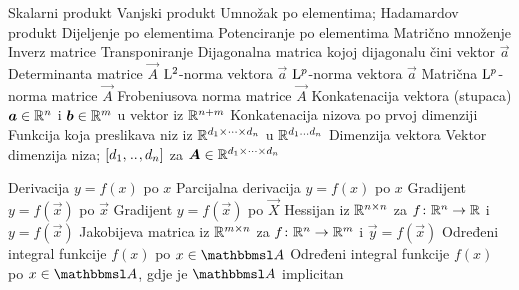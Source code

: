  {} 
	{Skalarni produkt}
	{Vanjski produkt}
	{Umnožak po elementima; Hadamardov produkt}
	{Dijeljenje po elementima}
	{Potenciranje po elementima}
	{Matrično množenje}
	{Inverz matrice}
	{Transponiranje}
	{Dijagonalna matrica kojoj dijagonalu čini vektor $\vec a$}
	{Determinanta matrice $\vec A$}
	{$\mathrm{L}^2$-norma vektora $\vec a$}
	{$\mathrm{L}^p$-norma vektora $\vec a$}
	{Matrična $\mathrm{L}^p$-norma matrice $\vec A$}
	{Frobeniusova norma matrice $\vec A$}
	{Konkatenacija vektora (stupaca) $\vec a\in\R^n$ i $\vec b\in\R^m$ u vektor iz $\mathbb{R}^{n+m}$}
	{Konkatenacija nizova po prvoj dimenziji}
	{Funkcija koja preslikava niz iz $\mathbb{R}^{d_1\times\dots\times d_n}$ u $\mathbb{R}^{d_1\dots d_n}$}
	{Dimenzija vektora}
	{Vektor dimenzija niza; $\sbr{d_1,\bidot,d_n}$ za $\vec A\in\R^{d_1\times\dots\times d_n}$}

	{Derivacija $y=f(x)$ po $x$}
	{Parcijalna derivacija $y=f(x)$ po $x$}
	{Gradijent $y=f(\vec x)$ po $\vec x$}
	{Gradijent $y=f(\vec x)$ po $\vec X$}
	{Hessijan iz $\mathbb{R}^{n\times n}$ za $f \colon \mathbb{R}^n \to \mathbb{R}$ i $y=f(\vec x)$}
	{Jakobijeva matrica iz $\mathbb{R}^{m\times n}$ za $f \colon \mathbb{R}^n \to \mathbb{R}^m$ i $\vec y=f(\vec x)$}
	{Određeni integral funkcije $f(x)$ po $x\in\set A$}
	{Određeni integral funkcije $f(x)$ po $x\in\set A$, gdje je $\set A$ implicitan}

